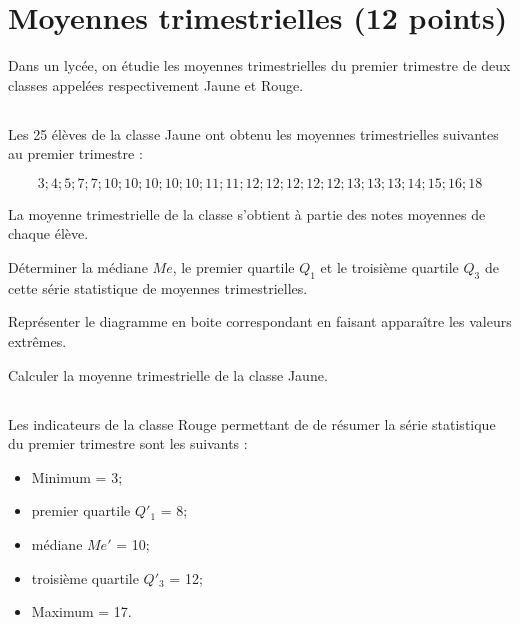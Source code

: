 \section{Moyennes trimestrielles (12 points)}

Dans un lycée, on étudie les moyennes trimestrielles du premier trimestre de deux classes appelées respectivement Jaune et Rouge.

\subsection{}
Les 25 élèves de la classe Jaune ont obtenu les moyennes trimestrielles suivantes au premier trimestre :

\begin{equation*}
3 ; 4 ; 5 ; 7 ; 7 ; 10 ; 10 ; 10 ; 10 ; 10 ; 11 ;  11 ; 12 ; 12 ; 12 ; 12 ; 12 ; 13 ; 13 ; 13 ; 14 ; 15 ; 16 ; 18
\end{equation*}

La moyenne trimestrielle de la classe s'obtient à partie des notes moyennes de chaque élève.

\begin{questions}
	\question[2] Déterminer la médiane $Me$, le premier quartile $Q_1$ et le troisième quartile $Q_3$ de cette série statistique de moyennes trimestrielles.
	
	\question[1\half] Représenter le diagramme en boite correspondant en faisant apparaître les valeurs extrêmes.
	
	\question[1] Calculer la moyenne trimestrielle de la classe Jaune.
\end{questions}

\subsection{}

Les indicateurs de la classe Rouge permettant de de résumer la série statistique du premier trimestre sont les suivants :

\begin{itemize}
	\item Minimum = 3;
	\item premier quartile $Q'_1$ = 8;
	\item médiane $Me'$ = 10;
	\item troisième quartile $Q'_3$ = 12;
	\item Maximum = 17.
\end{itemize}

